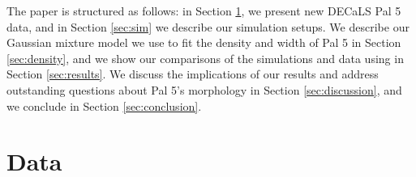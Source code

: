 \documentclass[modern]{aastex62}
\begin{document}
The paper is structured as follows: in Section \ref{sec:data}, we present new DECaLS Pal 5 data, and in Section \ref{sec:sim} we describe our simulation setups. We describe our Gaussian mixture model we use to fit the density and width of Pal 5 in Section \ref{sec:density}, and we show our comparisons of the simulations and data using in Section \ref{sec:results}. We discuss the implications of our results and address outstanding questions about Pal 5's morphology in Section \ref{sec:discussion}, and we conclude in Section \ref{sec:conclusion}. 



\section{Data}
\label{sec:data}
\end{document}
